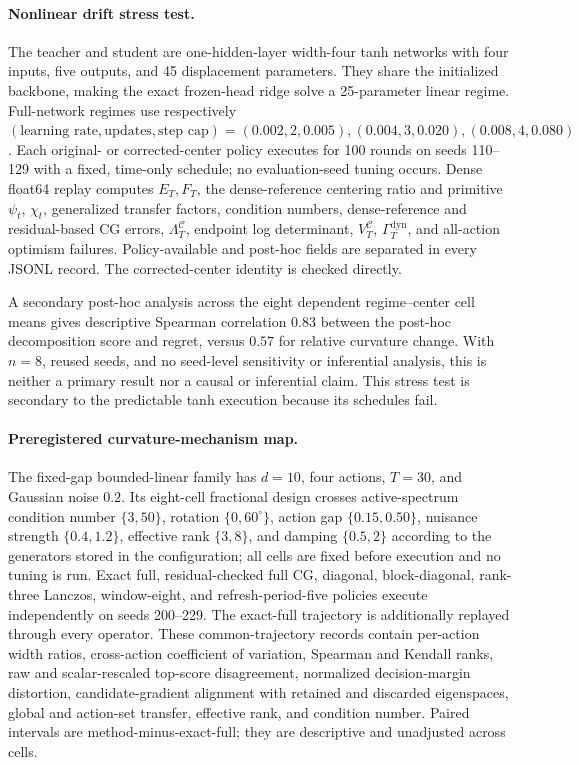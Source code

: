 \documentclass[twoside]{article}
\newcommand{\Calg}{\mathcal{C}}                 %
\newcommand{\Lamalg}{\Lambda^{\Calg}}           %
\newcommand{\Valg}{V^{\Calg}}                   %
\newcommand{\Gamdyn}{\Gamma^{\mathrm{dyn}}}     %
\begin{document}
\paragraph{Nonlinear drift stress test.}
The teacher and student are one-hidden-layer width-four tanh networks with four
inputs, five outputs, and 45 displacement parameters.  They share the initialized
backbone, making the exact frozen-head ridge solve a 25-parameter linear regime.
Full-network regimes use respectively $(\text{learning rate},\text{updates},
\text{step cap})=(0.002,2,0.005),(0.004,3,0.020),(0.008,4,0.080)$.
Each original- or corrected-center policy executes for 100 rounds on seeds 110--129
with a fixed, time-only schedule; no evaluation-seed tuning occurs.  Dense float64
replay computes $E_T,F_T$, the dense-reference centering ratio and primitive
$\psi_t$, $\chi_t$, generalized transfer factors, condition numbers,
dense-reference and residual-based CG errors, $\Lamalg_T$, endpoint log determinant,
$\Valg_T$, $\Gamdyn_T$, and
all-action optimism failures.  Policy-available and post-hoc fields are separated
in every JSONL record.  The corrected-center identity is checked directly.

A secondary post-hoc analysis across the eight dependent regime--center cell means gives
descriptive Spearman correlation $0.83$ between the post-hoc decomposition score
and regret, versus $0.57$ for relative curvature change.  With $n=8$, reused
seeds, and no seed-level sensitivity or inferential analysis, this is neither a
primary result nor a causal or inferential claim.  This stress test is secondary
to the predictable tanh execution because its schedules fail.

\paragraph{Preregistered curvature-mechanism map.}
The fixed-gap bounded-linear family has $d=10$, four actions, $T=30$, and
Gaussian noise $0.2$.  Its eight-cell fractional design crosses active-spectrum
condition number $\{3,50\}$, rotation $\{0,60^\circ\}$, action gap
$\{0.15,0.50\}$, nuisance strength $\{0.4,1.2\}$, effective rank
$\{3,8\}$, and damping $\{0.5,2\}$ according to the generators stored in
the configuration; all cells are fixed before execution and no tuning is run.
Exact full, residual-checked full CG, diagonal, block-diagonal, rank-three
Lanczos, window-eight, and refresh-period-five policies execute independently
on seeds 200--229.  The exact-full trajectory is additionally replayed through
every operator.  These common-trajectory records contain per-action width ratios,
cross-action coefficient of variation, Spearman and Kendall ranks, raw and
scalar-rescaled top-score disagreement, normalized decision-margin distortion,
candidate-gradient alignment with retained and discarded eigenspaces, global and
action-set transfer, effective rank, and condition number.  Paired intervals are
method-minus-exact-full; they are descriptive and unadjusted across cells.
\end{document}
